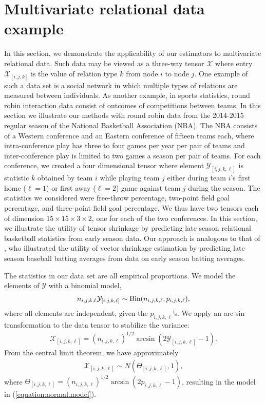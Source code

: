 \section{Multivariate relational data example}
\label{sec:NBA}

In this section, we demonstrate the
applicability of our estimators to multivariate relational data.
Such data may be viewed as a three-way tensor $\mathcal{X}$ where entry $\mathcal{X}_{[i,j,k]}$ is the value of relation type
$k$ from node $i$ to node $j$. One example of such a data set is a social network in which multiple types of relations are measured between individuals.
As another example, in sports statistics, round robin interaction data consist of outcomes of competitions between teams. In this section we illustrate our methods with round robin data from the 2014-2015
regular season of the National Basketball Association (NBA). The NBA
consists of a Western conference and an Eastern conference of
fifteen teams each, where intra-conference play has three to four
games per year per pair of teams and inter-conference play is limited
to two games a season per pair of teams. For each conference, we
created a four dimensional tensor where element $\mathcal{Y}_{[i,j,k,\ell]}$ is statistic $k$ obtained by team $i$ while playing team $j$ either during team $i$'s first home ($\ell = 1$) or first away ($\ell = 2$) game against team $j$ during the season. The statistics we considered were free-throw percentage, two-point field goal percentage, and three-point field goal percentage. We thus have two tensors each of dimension $15 \times 15 \times 3 \times 2$, one for each of the two conferences. 
In this section, we illustrate the utility of tensor shrinkage by predicting late season relational basketball statistics from early season data. Our approach is analogous to that of \cite{efron1975data}, who illustrated the utility of vector shrinkage estimation by predicting late season baseball batting averages from data on early season batting averages. 

The statistics in our data set are all empirical proportions. We model the elements of $\mathcal{Y}$ with a binomial model, 
\begin{align*}
n_{i,j,k,\ell}\mathcal{Y}_{[i,j,k,\ell]} \sim \operatorname*{Bin}(n_{i,j,k,\ell},p_{i,j,k,\ell}),
\end{align*}
where all elements are independent, given the $p_{i,j,k,\ell}$'s. We apply an arc-sin transformation to the data tensor to stabilize the variance:
\begin{align*}
\mathcal{X}_{[i,j,k,\ell]} = (n_{i,j,k,\ell})^{1/2}\arcsin(2\mathcal{Y}_{[i,j,k,\ell]} - 1).
\end{align*}
From the central limit theorem, we have approximately
\begin{align*}
\mathcal{X}_{[i,j,k,\ell]} \sim N(\Theta_{[i,j,k,\ell]},1),
\end{align*}
where $\Theta_{[i,j,k,\ell]} = (n_{i,j,k,\ell})^{1/2}\arcsin(2p_{i,j,k,\ell} -
1)$, resulting in the model in (\ref{equation:normal.model}).

